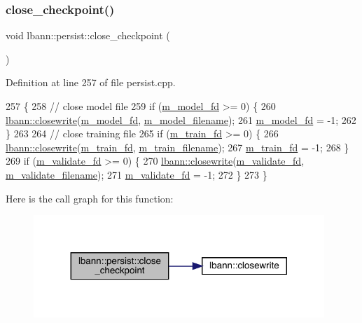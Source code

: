 \subsubsection{\texorpdfstring{close\+\_\+checkpoint()}{close\_checkpoint()}}
{\footnotesize\ttfamily void lbann\+::persist\+::close\+\_\+checkpoint (\begin{DoxyParamCaption}{ }\end{DoxyParamCaption})}



Definition at line 257 of file persist.\+cpp.


\begin{DoxyCode}
257                                     \{
258   \textcolor{comment}{// close model file}
259   \textcolor{keywordflow}{if} (\hyperlink{classlbann_1_1persist_a1adc7102c1b4bc91534ca156decbd965}{m\_model\_fd} >= 0) \{
260     \hyperlink{namespacelbann_aceeccedbbafccfa071b21ee99be794a5}{lbann::closewrite}(\hyperlink{classlbann_1_1persist_a1adc7102c1b4bc91534ca156decbd965}{m\_model\_fd}, \hyperlink{classlbann_1_1persist_ac01cd3c8fe0f97c1312ca1a595f2f690}{m\_model\_filename});
261     \hyperlink{classlbann_1_1persist_a1adc7102c1b4bc91534ca156decbd965}{m\_model\_fd} = -1;
262   \}
263 
264   \textcolor{comment}{// close training file}
265   \textcolor{keywordflow}{if} (\hyperlink{classlbann_1_1persist_a817671390811dde04670c47139402f51}{m\_train\_fd} >= 0) \{
266     \hyperlink{namespacelbann_aceeccedbbafccfa071b21ee99be794a5}{lbann::closewrite}(\hyperlink{classlbann_1_1persist_a817671390811dde04670c47139402f51}{m\_train\_fd}, \hyperlink{classlbann_1_1persist_a417a443c894fd07472504936f5b02b62}{m\_train\_filename});
267     \hyperlink{classlbann_1_1persist_a817671390811dde04670c47139402f51}{m\_train\_fd} = -1;
268   \}
269   \textcolor{keywordflow}{if} (\hyperlink{classlbann_1_1persist_a87927d03b0cf684023178f997c038783}{m\_validate\_fd} >= 0) \{
270     \hyperlink{namespacelbann_aceeccedbbafccfa071b21ee99be794a5}{lbann::closewrite}(\hyperlink{classlbann_1_1persist_a87927d03b0cf684023178f997c038783}{m\_validate\_fd}, 
      \hyperlink{classlbann_1_1persist_a8ccf3728c62f825ec2f8cfe15929fc2a}{m\_validate\_filename});
271     \hyperlink{classlbann_1_1persist_a87927d03b0cf684023178f997c038783}{m\_validate\_fd} = -1;
272   \}
273 \}
\end{DoxyCode}
Here is the call graph for this function\+:\nopagebreak
\begin{figure}[H]
\begin{center}
\leavevmode
\includegraphics[width=311pt]{classlbann_1_1persist_ab099939d0d91101fbfaf2b85e78be032_cgraph}
\end{center}
\end{figure}
